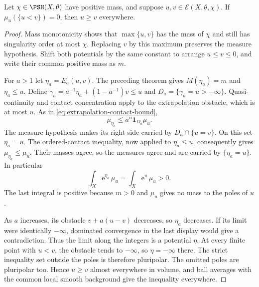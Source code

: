 \begin{theorem}\label{thm:relative-full-mass-domination}
Let $\chi\in\PSH(X,\theta)$ have positive mass, and suppose
$u,v\in\mathcal E(X,\theta,\chi)$. If
$\mu_u(\{u<v\})=0$, then $u\geq v$ everywhere.
\end{theorem}
\begin{proof}
Mass monotonicity shows that $\max\{u,v\}$ has the mass of $\chi$ and still has singularity order at most $\chi$. Replacing $v$ by this maximum preserves the measure hypothesis. Shift both potentials by the same constant to arrange $u\leq v\leq0$, and write their common positive mass as $m$.

For $a>1$ let $\eta_a=E_a(u,v)$. The preceding theorem gives $M(\eta_a)=m$ and $\eta_a\leq u$. Define
$\gamma_a=a^{-1}\eta_a+(1-a^{-1})v\leq u$ and $D_a=\{\gamma_a=u>-\infty\}$. Quasi-continuity and contact concentration apply to the extrapolation obstacle, which is at most $u$. As in \eqref{eq:extrapolation-contact-bound},
\[
 \mu_{\eta_a}\leq a^n\mathbf1_{D_a}\mu_u.
\]
The measure hypothesis makes its right side carried by $D_a\cap\{u=v\}$. On this set $\eta_a=u$. The ordered-contact inequality, now applied to $\eta_a\leq u$, consequently gives $\mu_{\eta_a}\leq\mu_u$. Their masses agree, so the measures agree and are carried by $\{\eta_a=u\}$. In particular
\[
 \int_X\mathrm e^{\eta_a}\,\mu_u
        =\int_X\mathrm e^u\,\mu_u>0.
\]
The last integral is positive because $m>0$ and $\mu_u$ gives no mass to the poles of $u$.

As $a$ increases, its obstacle $v+a(u-v)$ decreases, so $\eta_a$ decreases. If its limit were identically $-\infty$, dominated convergence in the last display would give a contradiction. Thus the limit along the integers is a potential $\eta$. At every finite point with $u<v$, the obstacle tends to $-\infty$, so $\eta=-\infty$ there. The strict inequality set outside the poles is therefore pluripolar. The omitted poles are pluripolar too. Hence $u\geq v$ almost everywhere in volume, and ball averages with the common local smooth background give the inequality everywhere.
\end{proof}


